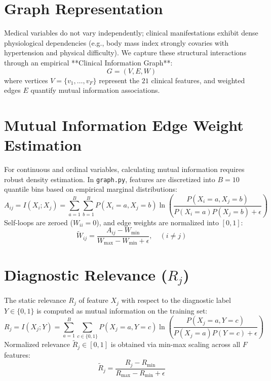 \documentclass[11pt,a4paper]{report}
\begin{document}
\section{Graph Representation}
Medical variables do not vary independently; clinical manifestations exhibit dense physiological dependencies (e.g., body mass index strongly covaries with hypertension and physical difficulty). We capture these structural interactions through an empirical **Clinical Information Graph**:
\begin{equation}
  G = (V, E, W)
\end{equation}
where vertices $V = \{v_1, \dots, v_F\}$ represent the $21$ clinical features, and weighted edges $E$ quantify mutual information associations.

\section{Mutual Information Edge Weight Estimation}
For continuous and ordinal variables, calculating mutual information requires robust density estimation. In \texttt{graph.py}, features are discretized into $B=10$ quantile bins based on empirical marginal distributions:
\begin{equation}
  A_{ij} = I(X_i; X_j) = \sum_{a=1}^B \sum_{b=1}^B P(X_i=a, X_j=b) \ln \left(\frac{P(X_i=a, X_j=b)}{P(X_i=a) P(X_j=b) + \epsilon}\right)
\end{equation}
Self-loops are zeroed ($W_{ii} = 0$), and edge weights are normalized into $[0, 1]$:
\begin{equation}
  \widetilde{W}_{ij} = \frac{A_{ij} - W_{\min}}{W_{\max} - W_{\min} + \epsilon}, \quad (i \ne j)
\end{equation}

\section{Diagnostic Relevance ($R_j$)}
The static relevance $R_j$ of feature $X_j$ with respect to the diagnostic label $Y \in \{0, 1\}$ is computed as mutual information on the training set:
\begin{equation}
  R_j = I(X_j; Y) = \sum_{a=1}^B \sum_{c \in \{0,1\}} P(X_j=a, Y=c) \ln \left(\frac{P(X_j=a, Y=c)}{P(X_j=a) P(Y=c) + \epsilon}\right)
\end{equation}
Normalized relevance $\widetilde{R}_j \in [0, 1]$ is obtained via min-max scaling across all $F$ features:
\begin{equation}
  \widetilde{R}_j = \frac{R_j - R_{\min}}{R_{\max} - R_{\min} + \epsilon}
\end{equation}
\end{document}
